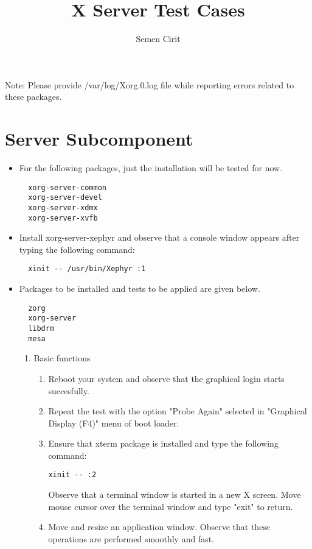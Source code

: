 \documentclass[a4paper,10pt]{article}
\title{X Server Test Cases}
\author{Semen Cirit}
\begin{document}
\maketitle

Note: Please provide /var/log/Xorg.0.log file while reporting errors related to these packages.

\section{Server Subcomponent}

\begin{itemize}
  \item For the following packages, just the installation will be tested for now.
  \begin{verbatim}
  xorg-server-common
  xorg-server-devel
  xorg-server-xdmx
  xorg-server-xvfb
  \end{verbatim}

  \item Install xorg-server-xephyr and observe that a console window appears after typing
        the following command:
  \begin{verbatim}
  xinit -- /usr/bin/Xephyr :1
  \end{verbatim}

  \item Packages to be installed and tests to be applied are given below.
  \begin{verbatim}
  zorg    
  xorg-server
  libdrm
  mesa
  \end{verbatim}


  \begin{enumerate}
  \item Basic functions
    \begin{enumerate}
    \item Reboot your system and observe that the graphical login starts succesfully.
    \item Repeat the test with the option "Probe Again" selected in "Graphical Display (F4)" menu of boot loader.
    \item Ensure that xterm package is installed and type the following command:
      \begin{verbatim}
xinit -- :2
      \end{verbatim}
      Observe that a terminal window is started in a new X screen. Move mouse cursor over the terminal window and type "exit" to return.
    \item Move and resize an application window. Observe that these operations are performed smoothly and fast.
    \end{enumerate}


\end{enumerate}
\end{itemize}
\end{document}
